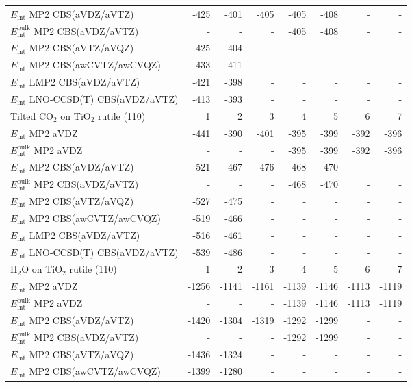\begin{longtable}{lrrrrrrr}
$E_\textrm{int}$ MP2 CBS(aVDZ/aVTZ) & -425 & -401 & -405 & -405 & -408 & - & - \\
$E_\textrm{int}^\textrm{bulk}$ MP2 CBS(aVDZ/aVTZ) & - & - & - & -405 & -408 & - & - \\
$E_\textrm{int}$ MP2 CBS(aVTZ/aVQZ) & -425 & -404 & - & - & - & - & - \\
$E_\textrm{int}$ MP2 CBS(awCVTZ/awCVQZ) & -433 & -411 & - & - & - & - & - \\
$E_\textrm{int}$ LMP2 CBS(aVDZ/aVTZ) & -421 & -398 & - & - & - & - & - \\
$E_\textrm{int}$ LNO-CCSD(T) CBS(aVDZ/aVTZ) & -413 & -393 & - & - & - & - & - \\
\toprule
Tilted CO$_2$ on TiO$_2$ rutile (110) & 1 & 2 & 3 & 4 & 5 & 6 & 7 \\ 
\midrule
$E_\textrm{int}$ MP2 aVDZ & -441 & -390 & -401 & -395 & -399 & -392 & -396 \\
$E_\textrm{int}^\textrm{bulk}$ MP2 aVDZ & - & - & - & -395 & -399 & -392 & -396 \\
$E_\textrm{int}$ MP2 CBS(aVDZ/aVTZ) & -521 & -467 & -476 & -468 & -470 & - & - \\
$E_\textrm{int}^\textrm{bulk}$ MP2 CBS(aVDZ/aVTZ) & - & - & - & -468 & -470 & - & - \\
$E_\textrm{int}$ MP2 CBS(aVTZ/aVQZ) & -527 & -475 & - & - & - & - & - \\
$E_\textrm{int}$ MP2 CBS(awCVTZ/awCVQZ) & -519 & -466 & - & - & - & - & - \\
$E_\textrm{int}$ LMP2 CBS(aVDZ/aVTZ) & -516 & -461 & - & - & - & - & - \\
$E_\textrm{int}$ LNO-CCSD(T) CBS(aVDZ/aVTZ) & -539 & -486 & - & - & - & - & - \\
\toprule
H$_2$O on TiO$_2$ rutile (110) & 1 & 2 & 3 & 4 & 5 & 6 & 7 \\ 
\midrule
$E_\textrm{int}$ MP2 aVDZ & -1256 & -1141 & -1161 & -1139 & -1146 & -1113 & -1119 \\
$E_\textrm{int}^\textrm{bulk}$ MP2 aVDZ & - & - & - & -1139 & -1146 & -1113 & -1119 \\
$E_\textrm{int}$ MP2 CBS(aVDZ/aVTZ) & -1420 & -1304 & -1319 & -1292 & -1299 & - & - \\
$E_\textrm{int}^\textrm{bulk}$ MP2 CBS(aVDZ/aVTZ) & - & - & - & -1292 & -1299 & - & - \\
$E_\textrm{int}$ MP2 CBS(aVTZ/aVQZ) & -1436 & -1324 & - & - & - & - & - \\
$E_\textrm{int}$ MP2 CBS(awCVTZ/awCVQZ) & -1399 & -1280 & - & - & - & - & - \\

\end{longtable}

